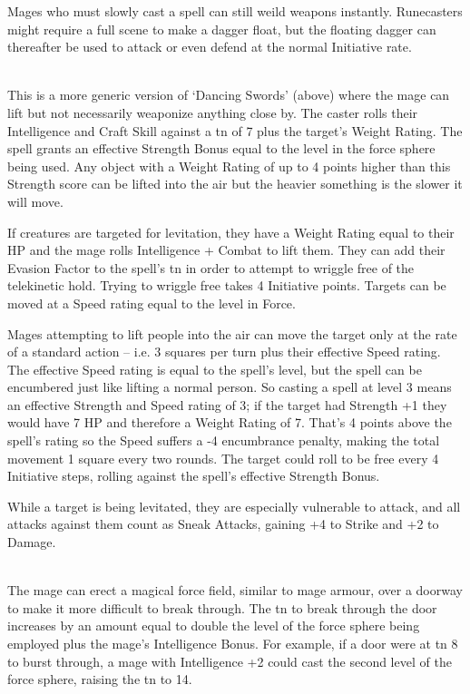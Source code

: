\documentclass[titlepage,a4paper,openany]{book}
\begin{document}
\begin{multicols}{2}
Mages who must slowly cast a spell can still weild weapons instantly.  Runecasters might require a full scene to make a dagger float, but the floating dagger can thereafter be used to attack or even defend at the normal Initiative rate.

\\
This is a more generic version of `Dancing Swords' (above) where the mage can lift but not necessarily weaponize anything close by. The caster rolls their Intelligence and Craft Skill against a \gls{tn} of 7 plus the target's Weight Rating. The spell grants an effective Strength Bonus equal to the level in the force sphere being used. Any object with a Weight Rating of up to 4 points higher than this Strength score can be lifted into the air but the heavier something is the slower it will move.

If creatures are targeted for levitation, they have a Weight Rating equal to their HP and the mage rolls Intelligence + Combat to lift them. They can add their Evasion Factor to the spell's \gls{tn} in order to attempt to wriggle free of the telekinetic hold. Trying to wriggle free takes 4 Initiative points. Targets can be moved at a Speed rating equal to the level in Force.

Mages attempting to lift people into the air can move the target only at the rate of a standard action -- i.e. 3 squares per turn plus their effective Speed rating. The effective Speed rating is equal to the spell's level, but the spell can be encumbered just like lifting a normal person. So casting a spell at level 3 means an effective Strength and Speed rating of 3; if the target had Strength +1 they would have 7 HP and therefore a Weight Rating of 7. That's 4 points above the spell's rating so the Speed suffers a -4 encumbrance penalty, making the total movement 1 square every two \glspl{round}. The target could roll to be free every 4 Initiative steps, rolling against the spell's effective Strength Bonus.

While a target is being levitated, they are especially vulnerable to attack, and all attacks against them count as Sneak Attacks, gaining +4 to Strike and +2 to Damage.

\\
The mage can erect a magical force field, similar to mage armour, over a doorway to make it more difficult to break through. The \gls{tn} to break through the door increases by an amount equal to double the level of the force sphere being employed plus the mage's Intelligence Bonus. For example, if a door were at \gls{tn} 8 to burst through, a mage with Intelligence +2 could cast the second level of the force sphere, raising the \gls{tn} to 14.


\end{multicols}
\end{document}

